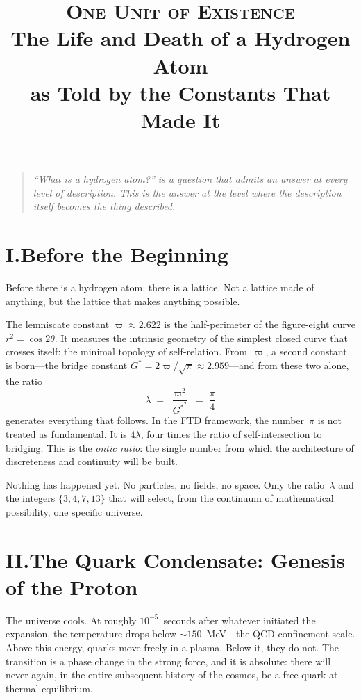 \documentclass[11pt,a4paper]{article}
\title{\textsc{One Unit of Existence}\\[6pt]
\large The Life and Death of a Hydrogen Atom\\
as Told by the Constants That Made It}
\author{}
\date{}
\newcommand{\Gstar}{G^{*}}
\newcommand{\vpi}{\varpi}
\begin{document}
\maketitle
\thispagestyle{empty}

\begin{quote}\itshape
``What is a hydrogen atom?'' is a question that admits an answer at every
level of description.  This is the answer at the level where the description
itself becomes the thing described.
\end{quote}

\section*{I.\quad Before the Beginning}

Before there is a hydrogen atom, there is a lattice.  Not a lattice made of
anything, but the lattice that makes anything possible.

The lemniscate constant $\vpi\approx 2.622$ is the half-perimeter of the
figure-eight curve $r^2=\cos 2\theta$.  It measures the intrinsic geometry of
the simplest closed curve that crosses itself: the minimal topology of
self-relation.  From~$\vpi$, a second constant is born---the bridge constant
$\Gstar = 2\vpi/\sqrt{\pi}\approx 2.959$---and from these two alone, the
ratio
\[
\lambda \;=\; \frac{\vpi^2}{\Gstar^2} \;=\; \frac{\pi}{4}
\]
generates everything that follows.  In the FTD framework, the number~$\pi$
is not treated as fundamental.  It is $4\lambda$, four times the ratio of
self-intersection to bridging.  This is the \emph{ontic ratio}: the single
number from which the architecture of discreteness and continuity will be
built.

Nothing has happened yet.  No particles, no fields, no space.  Only the
ratio~$\lambda$ and the integers $\{3,4,7,13\}$ that will select, from the
continuum of mathematical possibility, one specific universe.

\section*{II.\quad The Quark Condensate: Genesis of the Proton}

The universe cools.  At roughly $10^{-5}$~seconds after whatever initiated
the expansion, the temperature drops below $\sim 150$~MeV---the QCD
confinement scale.  Above this energy, quarks move freely in a plasma.
Below it, they do not.  The transition is a phase change in the strong
force, and it is absolute: there will never again, in the entire subsequent
history of the cosmos, be a free quark at thermal equilibrium.
\end{document}
